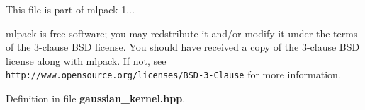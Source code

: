 This file is part of mlpack 1...

mlpack is free software; you may redstribute it and/or modify it under the terms of the 3-\/clause B\-S\-D license. You should have received a copy of the 3-\/clause B\-S\-D license along with mlpack. If not, see {\tt http\-://www.\-opensource.\-org/licenses/\-B\-S\-D-\/3-\/\-Clause} for more information. 

Definition in file {\bf gaussian\-\_\-kernel.\-hpp}.

